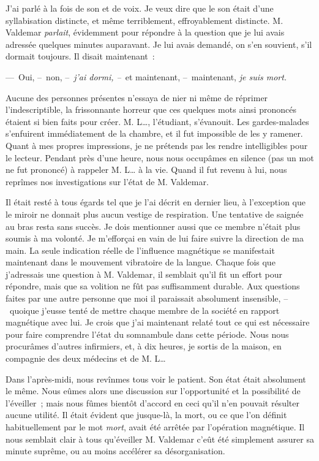 \documentclass[french,twoside]{book} %
\begin{document}
J’ai parlé à la fois de son et de voix. Je veux dire que le son était d’une syllabisation distincte, et même terriblement, effroyablement distincte. M. Valdemar \emph{parlait}, évidemment pour répondre à la question que je lui avais adressée quelques minutes auparavant. Je lui avais demandé, on s’en souvient, s’il dormait toujours. Il disait maintenant :\par
— Oui, – non, – \emph{j’ai dormi, –} et maintenant, – maintenant, \emph{je suis mort.}\par
Aucune des personnes présentes n’essaya de nier ni même de réprimer l’indescriptible, la frissonnante horreur que ces quelques mots ainsi prononcés étaient si bien faits pour créer. M. L…, l’étudiant, s’évanouit. Les gardes-malades s’enfuirent immédiatement de la chambre, et il fut impossible de les y ramener. Quant à mes propres impressions, je ne prétends pas les rendre intelligibles pour le lecteur. Pendant près d’une heure, nous nous occupâmes en silence (pas un mot ne fut prononcé) à rappeler M. L… à la vie. Quand il fut revenu à lui, nous reprîmes nos investigations sur l’état de M. Valdemar.\par
Il était resté à tous égards tel que je l’ai décrit en dernier lieu, à l’exception que le miroir ne donnait plus aucun vestige de respiration. Une tentative de saignée au bras resta sans succès. Je dois mentionner aussi que ce membre n’était plus soumis à ma volonté. Je m’efforçai en vain de lui faire suivre la direction de ma main. La seule indication réelle de l’influence magnétique se manifestait maintenant dans le mouvement vibratoire de la langue. Chaque fois que j’adressais une question à M. Valdemar, il semblait qu’il fit un effort pour répondre, mais que sa volition ne fût pas suffisamment durable. Aux questions faites par une autre personne que moi il paraissait absolument insensible, – quoique j’eusse tenté de mettre chaque membre de la société en rapport magnétique avec lui. Je crois que j’ai maintenant relaté tout ce qui est nécessaire pour faire comprendre l’état du somnambule dans cette période. Nous nous procurâmes d’autres infirmiers, et, à dix heures, je sortis de la maison, en compagnie des deux médecins et de M. L…\par
Dans l’après-midi, nous revînmes tous voir le patient. Son état était absolument le même. Nous eûmes alors une discussion sur l’opportunité et la possibilité de l’éveiller ; mais nous fûmes bientôt d’accord en ceci qu’il n’en pouvait résulter aucune utilité. Il était évident que jusque-là, la mort, ou ce que l’on définit habituellement par le mot \emph{mort}, avait été arrêtée par l’opération magnétique. Il nous semblait clair à tous qu’éveiller M. Valdemar c’eût été simplement assurer sa minute suprême, ou au moins accélérer sa désorganisation.\par
\end{document}
